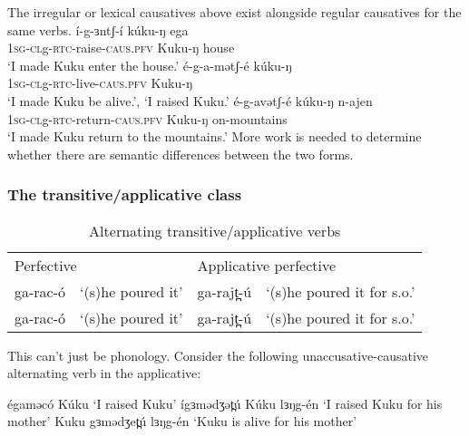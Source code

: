 The irregular or lexical causatives above exist alongside regular causatives for the same verbs.
\ea 
	\ea \gll í-g-ɜntʃ-í kúku-ŋ ega  \\
		 \textsc{1sg-cl}g-\textsc{rtc}-raise-\textsc{caus.pfv} Kuku-ŋ house\\
		\glt 	 `I made Kuku enter the house.'
	\ex \gll é-g-a-mətʃ-é kúku-ŋ \\
		 \textsc{1sg-cl}g-\textsc{rtc}-live-\textsc{caus.pfv} Kuku-ŋ\\
		\glt 	 `I made Kuku be alive.', `I raised Kuku.'
	\ex \gll é-g-avətʃ-é kúku-ŋ n-ajen \\
		 \textsc{1sg-cl}g-\textsc{rtc}-return-\textsc{caus.pfv} Kuku-ŋ on-mountains\\
		\glt 	 `I made Kuku return to the mountains.'
	\z
\z
More work is needed to determine whether there are semantic differences between the two forms.



\subsubsection{The transitive/applicative class}

\begin{table}
\begin{tabular}[t]{llll}
\multicolumn{2}{l}{Perfective}	& 	\multicolumn{2}{l}{Applicative perfective} \\
ga-rac-ó	& `(s)he poured it'	& ga-rajt̪-ú	&	`(s)he poured it for s.o.' \\
ga-rac-ó	& `(s)he poured it'	& ga-rajt̪-ú	&	`(s)he poured it for s.o.' \\
  	 \end{tabular}
\caption{Alternating transitive/applicative verbs}	\label{tab:ch11:taalt} 
\end{table}


This can't just be phonology. Consider the following unaccusative-causative alternating verb in the applicative:

égaməcó Kúku `I raised Kuku'
ígɜmədʒət̪ú Kúku lɜŋg-én `I raised Kuku for his mother'
Kuku gɜmədʒet̪ú lɜŋg-én `Kuku is alive for his mother'


%
%
%
%
%
%
%



